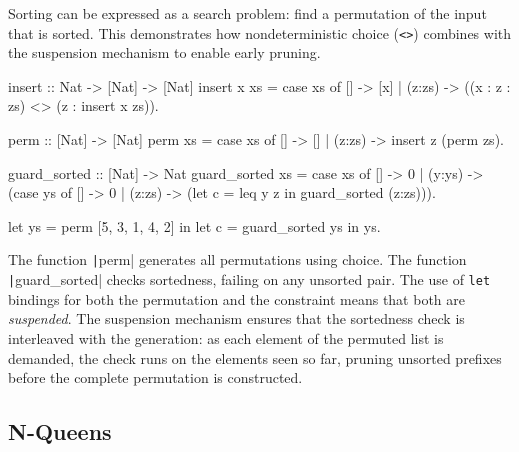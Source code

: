 Sorting can be expressed as a search problem: find a permutation of the input
that is sorted. This demonstrates how nondeterministic choice (\texttt{<>})
combines with the suspension mechanism to enable early pruning.
%
\begin{haskellcode}
insert :: Nat -> [Nat] -> [Nat]
insert x xs = case xs of
    [] -> [x]
  | (z:zs) -> ((x : z : zs) <> (z : insert x zs)).

perm :: [Nat] -> [Nat]
perm xs = case xs of
    [] -> []
  | (z:zs) -> insert z (perm zs).

guard_sorted :: [Nat] -> Nat
guard_sorted xs = case xs of
    [] -> 0
  | (y:ys) -> (case ys of
      [] -> 0
    | (z:zs) -> (let c = leq y z in guard_sorted (z:zs))).

let ys = perm [5, 3, 1, 4, 2] in
let c = guard_sorted ys in
ys.
\end{haskellcode}
%
\noindent The function \texttt|perm| generates all permutations
using choice. The function \texttt|guard_sorted| checks
sortedness, failing on any unsorted pair. The use of \texttt{let} bindings for
both the permutation and the constraint means that both are \emph{suspended}.
The suspension mechanism ensures that the sortedness check is interleaved with
the generation: as each element of the permuted list is demanded, the check
runs on the elements seen so far, pruning unsorted prefixes before the complete
permutation is constructed.

\subsection{N-Queens}

